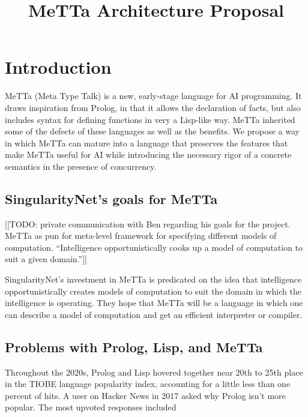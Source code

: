 \documentclass{article}
\title{MeTTa Architecture Proposal}
\author{}
\date{}
\begin{document}
\maketitle

\section{Introduction}

MeTTa (Meta Type Talk) is a new, early-stage language for AI programming.  It draws inspiration from Prolog, in that it allows the declaration of facts, but also includes syntax for defining functions in very a Lisp-like way.  MeTTa inherited some of the defects of these languages as well as the benefits.  We propose a way in which MeTTa can mature into a language that preserves the features that make MeTTa useful for AI while introducing the necessary rigor of a concrete semantics in the presence of concurrency.

\subsection{SingularityNet's goals for MeTTa}

[[TODO: private communication with Ben regarding his goals for the project. MeTTa as pun for meta-level framework for specifying different models of computation. ``Intelligence opportunistically cooks up a model of computation to suit a given domain.'']]

SingularityNet's investment in MeTTa is predicated on the idea that intelligence opportunistically creates models of computation to suit the domain in which the intelligence is operating.  They hope that MeTTa will be a language in which one can describe a model of computation and get an efficient interpreter or compiler.

\subsection{Problems with Prolog, Lisp, and MeTTa}

Throughout the 2020s, Prolog and Lisp hovered together near 20th to 25th place in the 
TIOBE language popularity index, accounting for a little less than one percent of hits.  A user on Hacker News in 2017 
asked why Prolog isn't more popular.  The most upvoted responses included
\end{document}
